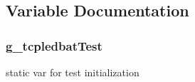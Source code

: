 \subsection{Variable Documentation}
\subsubsection[{\texorpdfstring{g\+\_\+tcpledbat\+Test}{g_tcpledbatTest}}]{ g\+\_\+tcpledbat\+Test\hspace{0.3cm}{\ttfamily [static]}}\hypertarget{tcp-ledbat-test_8cc_a4af1a991ff48fbc6b39ab02d5dd441b0}{}\label{tcp-ledbat-test_8cc_a4af1a991ff48fbc6b39ab02d5dd441b0}


static var for test initialization 

